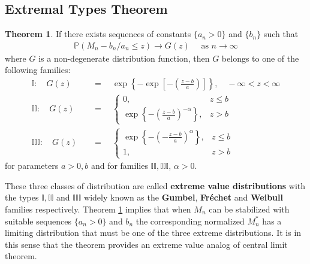 \documentclass[a4paper,10pt]{article}
\theoremstyle{definition}
\newtheorem{thm}{Theorem}[section]
\numberwithin{equation}{section}
\begin{document}
\subsection{Extremal Types Theorem}

\begin{thm}\label{thm:gfw}
If there exists sequences of constants $\{a_n>0\}$ and $\{b_n\}$ such that 
\begin{align*}
\mathbb{P}(M_n-b_n/a_n \leq z) \to G(z) \quad \text{ as } n \to \infty
\end{align*}
where $G$ is a non-degenerate distribution function, then $G$ belongs to one of the following families:
\begin{align*}
\mathbb{I}:\quad G(z)\quad&= \quad\exp \left\{-\exp\left[-\left(\frac{z-b}{a}\right)\right]\right\}, \quad -\infty<z<\infty\\
\mathbb{II}: \quad G(z)\quad&= \quad\begin{cases}
0, & z \leq b\\
\exp\left\{-\left(\frac{z-b}{a}\right)^{-\alpha}\right\}, &z >b
\end{cases}
\\
\mathbb{III}:\quad G(z)\quad&=  \quad\begin{cases}
\exp\left\{-\left(-\frac{z-b}{a}\right)^{\alpha}\right\}, & z \leq b\\
1, &z >b
\end{cases}
\end{align*}
for parameters $a>0, b$ and for families $\mathbb{II}, \mathbb{III}$, $\alpha >0$.
\end{thm}
These three classes of distribution are called \textbf{extreme value distributions} with the types $\mathbb{I},\mathbb{II}$ and $\mathbb{III}$ widely known as the \textbf{Gumbel}, \textbf{Fr\'echet} and \textbf{Weibull} families respectively. Theorem \ref{thm:gfw} implies that when $M_n$ can be stabilized with suitable sequences $\{a_n>0\}$ and $b_n$ the corresponding normalized $M_n^\ast$ has a limiting distribution that must be one of the three extreme distributions. It is in this sense that the theorem provides an extreme value analog of central limit theorem.
\end{document}
